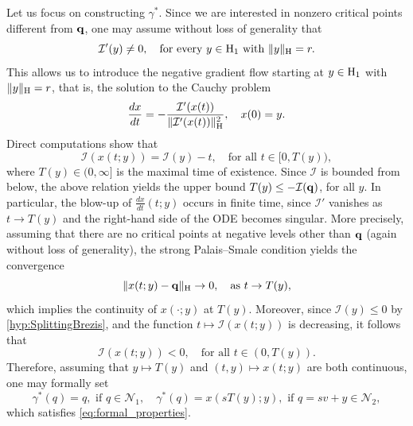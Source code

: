 \documentclass{article}
\newcommand{\boI}{\mathcal{I}}
\newcommand{\boN}{\mathcal{N}}
\newcommand{\Hilb}{{\textnormal H}}
\newcommand{\minq}{{\bf q}}
\newcommand{\taumax}{T}
\theoremstyle{definition}
\begin{document}
    Let us focus on constructing $\gamma^*$. Since we are interested in nonzero critical points different from $\minq$, one may assume without loss of generality that
\[\boI'(y)\not=0,\quad\text{for every }y\in\Hilb_1\text{ with }\|y\|_\Hilb=r.\]
This allows us to introduce the negative gradient flow starting at $y\in \Hilb_1$ with $\|y\|_\Hilb=r$, that is, the solution to the Cauchy problem
\begin{equation}
    \frac{dx}{dt}=-\frac{\boI'(x(t))}{\|\boI'(x(t))\|_\Hilb^2},\quad x(0)=y.
\end{equation}
Direct computations show that
\[\boI(x(t;y))=\boI(y)-t,\quad\text{for all }t\in [0,\taumax(y)),\]
where $\taumax(y)\in (0,\infty]$ is the maximal time of existence. Since $\boI$ is bounded from below, the above relation yields the upper bound $T(y)\leq-\boI(\minq)$, for all $y$. In particular, the blow-up of $\frac{dx}{dt}(t;y)$ occurs in finite time, since $\boI'$ vanishes as $t\to\taumax(y)$ and the right-hand side of the ODE becomes singular. More precisely, assuming that there are no critical points at negative levels other than $\minq$ (again without loss of generality), the strong Palais--Smale condition yields the convergence
\begin{equation*}
\|x(t;y)-\minq\|_\Hilb\to 0,\quad\text{as }t\to \taumax(y),
\end{equation*}
which implies the continuity of $x(\cdot;y)$ at $\taumax(y)$. Moreover, since $\boI(y)\leq 0$ by \eqref{hyp:SplittingBrezis}, and the function $t\mapsto\boI(x(t;y))$ is decreasing, it follows that
\[\boI(x(t;y))< 0,\quad\text{for all }t\in (0,\taumax(y)).\]
Therefore, assuming that $y\mapsto\taumax(y)$ and $(t,y)\mapsto x(t;y)$ are both continuous, one may formally set
\[\gamma^*(q)=q,\text{ if }q\in\boN_1,\quad \gamma^*(q)=x(s\taumax(y);y),\text{ if } q=sv+y\in\boN_2,\]
which satisfies \eqref{eq:formal_properties}.  
\end{document}
